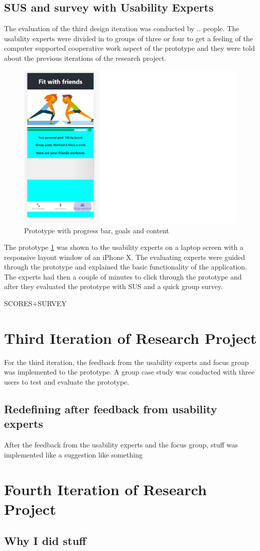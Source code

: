 \subsection{SUS and survey with Usability Experts}
The evaluation of the third design iteration was conducted by .. people. The usability experts were divided in to groups of three or four to get a feeling of the computer supported cooperative work aspect of the prototype and they were told about the previous iterations of the research project.
\begin{figure}[H]
    \centering
    \includegraphics[scale=0.6]{figures/GruppeAspekt1.png}
    \caption{Prototype with progress bar, goals and content}
    \label{GruppeAss1}
\end{figure}

The prototype \ref{GruppeAss1} was shown to the usability experts on a laptop screen with a responsive layout window of an iPhone X. The evaluating experts were guided through the prototype and explained the basic functionality of the application. The experts had then a couple of minutes to click through the prototype and after they evaluated the prototype with SUS and a quick group survey.

SCORES+SURVEY




\section{Third Iteration of Research Project}
For the third iteration, the feedback from the usability experts and focus group was implemented to the prototype. A group case study was conducted with three users to test and evaluate the prototype.
\subsection{Redefining after feedback from usability experts}
After the feedback from the usability experts and the focus group, stuff was implemented like a suggestion like something 

\section{Fourth Iteration of Research Project}
\subsection{Why I did stuff}
